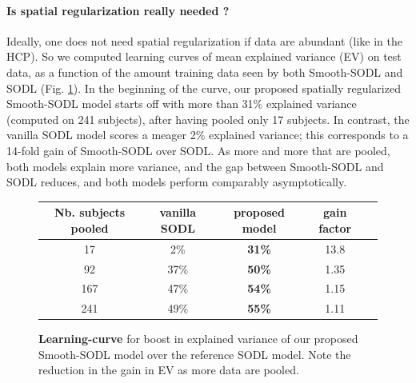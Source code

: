         
\paragraph{Is spatial regularization really needed ?}
Ideally, one does not need spatial regularization if data are abundant (like in the HCP). So we computed learning curves of mean explained variance (EV) on test data, as a function of the amount training data seen by both Smooth-SODL and SODL   \citep{mairal2010} (Fig. \ref{fig:ev}).
In the beginning of the curve, our proposed spatially regularized Smooth-SODL model starts off with more than 31\% explained variance (computed on 241 subjects), after having pooled only 17 subjects. In contrast, the vanilla SODL model   \citep{mairal2010} scores a meager 2\% explained variance; this corresponds  to a 14-fold gain of Smooth-SODL over SODL. As more and more that are pooled, both models explain more variance, and the gap between Smooth-SODL and SODL reduces, and both models perform comparably asymptotically. %

\begin{figure}[!htp]
 \begin{tabular}{|c|c|c|c|c}\hline%
    {Nb. subjects pooled} & {vanilla SODL} & {proposed model} & {gain factor} \\ \hline
17 & {2\%} & \bf{31\%} & {13.8}\\\hline
92 & 37\% & \bf{50\%} & 1.35\\\hline
167 & 47\% & \bf{54\%} & 1.15\\\hline
241 & 49\% & \bf{55\%} & 1.11\\
  \end{tabular}
 \caption{\textbf{Learning-curve} for boost in explained variance of our proposed Smooth-SODL model over the reference SODL model.
   Note the reduction in the gain in EV as more data are pooled.}
 \label{fig:ev}
\end{figure}



